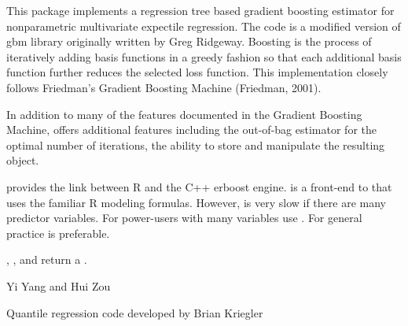 \documentclass[a4paper]{book}
\begin{document}
%
\begin{Details}\relax
This package implements a regression tree based gradient boosting estimator for nonparametric multivariate expectile regression. The code is a modified version of gbm library originally written by Greg Ridgeway.
Boosting is the process of iteratively adding basis functions in a greedy
fashion so that each additional basis function further reduces the selected
loss function. This implementation closely follows Friedman's Gradient
Boosting Machine (Friedman, 2001).

In addition to many of the features documented in the Gradient Boosting Machine,
 offers additional features including the out-of-bag estimator for
the optimal number of iterations, the ability to store and manipulate the
resulting  object.

 provides the link between R and the C++ erboost engine. 
is a front-end to  that uses the familiar R modeling formulas.
However,  is very slow if there are many
predictor variables. For power-users with many variables use .
For general practice  is preferable.

\end{Details}
%
\begin{Value}
, , and  return a
.
\end{Value}
%
\begin{Author}\relax
Yi Yang  and Hui Zou 

Quantile regression code developed by Brian Kriegler 
\end{Author}
%
\end{document}

